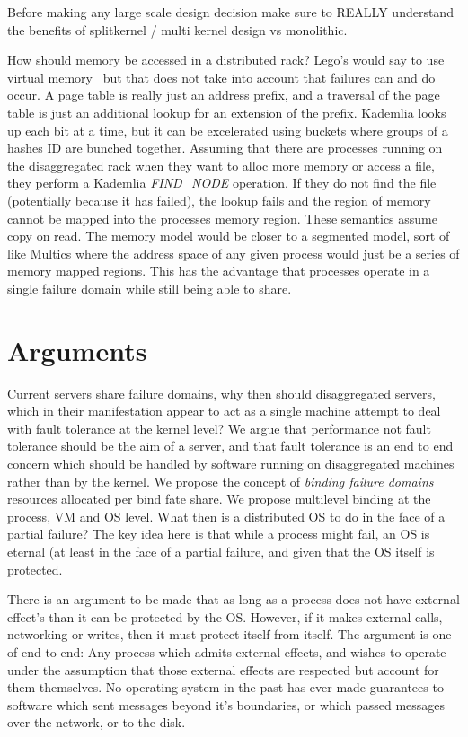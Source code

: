Before making any large scale design decision make sure to REALLY understand
the benefits of splitkernel / multi kernel design vs monolithic.

How should memory be accessed in a distributed rack? Lego's would say to use
virtual memory~\cite{legoos} but that does not take into account that failures
can and do occur. A page table is really just an address prefix, and a
traversal of the page table is just an additional lookup for an extension of
the prefix. Kademlia looks up each bit at a time, but it can be excelerated
using buckets where groups of a hashes ID are bunched together. Assuming that
there are processes running on the disaggregated rack when they want to alloc
more memory or access a file, they perform a Kademlia \textit{FIND\_NODE}
operation. If they do not find the file (potentially because it has failed),
the lookup fails and the region of memory cannot be mapped into the processes
memory region. These semantics assume copy on read. The memory model would be
closer to a segmented model, sort of like Multics where the address space of
any given process would just be a series of memory mapped regions. This has the
advantage that processes operate in a single failure domain while still being
able to share.

\section{Arguments}
\label{sec:arguments}

Current servers share failure domains, why then should disaggregated servers, which
in their manifestation appear to act as a single machine attempt to deal with
fault tolerance at the kernel level? We argue that performance not fault
tolerance should be the aim of a server, and that fault tolerance is an end to
end concern which should be handled by software running on disaggregated
machines rather than by the kernel. We propose the concept of \textit{binding
failure domains} resources allocated per bind fate share. We propose multilevel
binding at the process, VM and OS level. What then is a distributed OS to do in
the face of a partial failure? The key idea here is that while a process might fail, an OS is eternal (at least in the face of a partial failure, and given that the OS itself is protected.

There is an argument to be made that as long as a process does not have
external effect's than it can be protected by the OS. However, if it makes
external calls, networking or writes, then it must protect itself from itself.
The argument is one of end to end: Any process which admits external effects,
and wishes to operate under the assumption that those external effects are
respected but account for them themselves. No operating system in the past has
ever made guarantees to software which sent messages beyond it's boundaries, or
which passed messages over the network, or to the disk.

